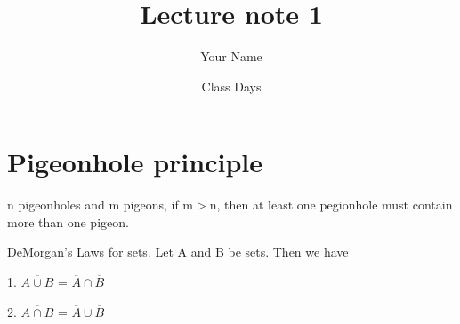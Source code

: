 \documentclass[12pt]{article}
\newenvironment{theorem}[2][Theorem]{\begin{trivlist}
\item[\hskip \labelsep {\bfseries #1}\hskip \labelsep {\bfseries #2.}]}{\end{trivlist}}
\begin{document}
 

\rhead{\today}

\title{Lecture note 1}
\author{Your Name}
\date{Class Days}
\maketitle

\section{Pigeonhole principle}

\begin{theorem}{1}
     $\mathrm{n}$ pigeonholes and $\mathrm{m}$ pigeons, if $\mathrm{m} > \mathrm{n}$, then at least one pegionhole must contain more than one pigeon.
\end{theorem}
 
\begin{theorem}{2.3} %
DeMorgan's Laws for sets. Let A and B be sets. Then we have

1. $\overline{A \cup B}$ = $\overline{A} \cap \overline{B}$

2. $\overline{A \cap B}$ = $\overline{A} \cup \overline{B}$

\end{theorem} 
\end{document}

